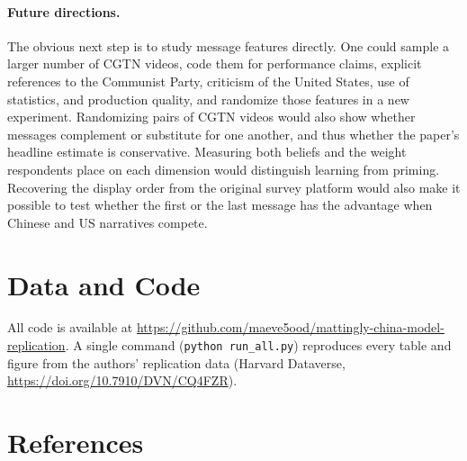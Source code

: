\documentclass[11pt]{article}
\begin{document}
\paragraph{Future directions.} The obvious next step is to study message features directly. One could sample a larger number of CGTN videos, code them for performance claims, explicit references to the Communist Party, criticism of the United States, use of statistics, and production quality, and randomize those features in a new experiment. Randomizing pairs of CGTN videos would also show whether messages complement or substitute for one another, and thus whether the paper's headline estimate is conservative. Measuring both beliefs and the weight respondents place on each dimension would distinguish learning from priming. Recovering the display order from the original survey platform would also make it possible to test whether the first or the last message has the advantage when Chinese and US narratives compete.

\section*{Data and Code}

All code is available at \url{https://github.com/maeve5ood/mattingly-china-model-replication}. A single command (\texttt{python run\_all.py}) reproduces every table and figure from the authors' replication data (Harvard Dataverse, \url{https://doi.org/10.7910/DVN/CQ4FZR}).

\section*{References}
\end{document}
